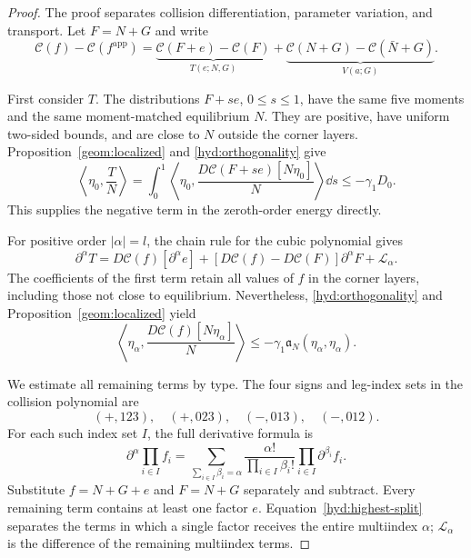 \begin{proof}
 The proof separates collision differentiation, parameter variation,
 and transport. Let $F=N+G$ and write
 \begin{equation}\label{hyd:collision-split}
 \mathcal C(f)-\mathcal C(f^{\mathrm{app}})
 =\underbrace{\mathcal C(F+e)-\mathcal C(F)}_{T(e;N,G)}
  +\underbrace{\mathcal C(N+G)-\mathcal C(\bar N+G)}_{V(a;G)}.
 \end{equation}

 First consider $T$. The distributions $F+se$, $0\le s\le1$, have the
 same five moments and the same moment-matched equilibrium $N$. They
 are positive, have uniform two-sided bounds, and are close to $N$
 outside the corner layers. Proposition~\ref{geom:localized} and
 \eqref{hyd:orthogonality} give
 \begin{equation}\label{hyd:collision-zero}
 \left\langle\eta_0,\frac{T}{N}\right\rangle
 =\int_0^1\left\langle\eta_0,
      \frac{D\mathcal C(F+se)[N\eta_0]}N\right\rangle\dd s
 \le-\gamma_1D_0.
 \end{equation}
 This supplies the negative term in the zeroth-order energy directly.

 For positive order $|\alpha|=l$, the chain rule for the cubic polynomial
 gives
 \begin{equation}\label{hyd:highest-split}
 \partial^\alpha T
 =D\mathcal C(f)[\partial^\alpha e]
   +[D\mathcal C(f)-D\mathcal C(F)]\partial^\alpha F
   +\mathcal L_\alpha.
 \end{equation}
 The coefficients of the first term retain all values of $f$ in the
 corner layers, including those not close to equilibrium. Nevertheless,
 \eqref{hyd:orthogonality} and Proposition~\ref{geom:localized} yield
 \begin{equation}\label{hyd:highest-negative}
 \left\langle\eta_\alpha,
            \frac{D\mathcal C(f)[N\eta_\alpha]}N\right\rangle
       \le-\gamma_1\mathfrak a_N(\eta_\alpha,\eta_\alpha).
 \end{equation}

 We estimate all remaining terms by type. The four signs and leg-index
 sets in the collision polynomial are
 \[
 (+,123),\quad (+,023),\quad (-,013),\quad (-,012).
 \]
 For each such index set $I$, the full derivative formula is
 \begin{equation}\label{hyd:all-parents}
 \partial^\alpha\prod_{i\in I}f_i
 =\sum_{\sum_{i\in I}\beta_i=\alpha}
          \frac{\alpha!}{\prod_{i\in I}\beta_i!}
             \prod_{i\in I}\partial^{\beta_i}f_i.
 \end{equation}
 Substitute $f=N+G+e$ and $F=N+G$ separately and subtract. Every remaining
 term contains at least one factor $e$. Equation~\eqref{hyd:highest-split}
 separates the terms in which a single factor receives the entire
 multiindex $\alpha$; $\mathcal L_\alpha$ is the difference of the
 remaining multiindex terms.


\end{proof}
